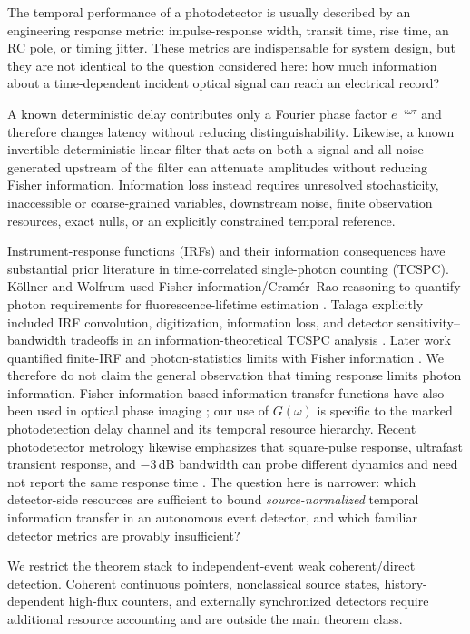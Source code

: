 \documentclass[aps,prapplied,preprint,nofootinbib]{revtex4-2}
\begin{document}
The temporal performance of a photodetector is usually described by an engineering response metric: impulse-response width, transit time, rise time, an RC pole, or timing jitter. These metrics are indispensable for system design, but they are not identical to the question considered here: how much information about a time-dependent incident optical signal can reach an electrical record?

A known deterministic delay contributes only a Fourier phase factor $e^{-i\omega\tau}$ and therefore changes latency without reducing distinguishability. Likewise, a known invertible deterministic linear filter that acts on both a signal and all noise generated upstream of the filter can attenuate amplitudes without reducing Fisher information. Information loss instead requires unresolved stochasticity, inaccessible or coarse-grained variables, downstream noise, finite observation resources, exact nulls, or an explicitly constrained temporal reference.

Instrument-response functions (IRFs) and their information consequences have substantial prior literature in time-correlated single-photon counting (TCSPC). K\"ollner and Wolfrum used Fisher-information/Cram\'er--Rao reasoning to quantify photon requirements for fluorescence-lifetime estimation \cite{KollnerWolfrum1992}. Talaga explicitly included IRF convolution, digitization, information loss, and detector sensitivity--bandwidth tradeoffs in an information-theoretical TCSPC analysis \cite{Talaga2009}. Later work quantified finite-IRF and photon-statistics limits with Fisher information \cite{Bouchet2019,TrinhEsposito2021}. We therefore do not claim the general observation that timing response limits photon information. Fisher-information-based information transfer functions have also been used in optical phase imaging \cite{KoppellKasevich2021}; our use of $G(\omega)$ is specific to the marked photodetection delay channel and its temporal resource hierarchy. Recent photodetector metrology likewise emphasizes that square-pulse response, ultrafast transient response, and $-3\,$dB bandwidth can probe different dynamics and need not report the same response time \cite{Deng2026}. The question here is narrower: which detector-side resources are sufficient to bound \emph{source-normalized} temporal information transfer in an autonomous event detector, and which familiar detector metrics are provably insufficient?

We restrict the theorem stack to independent-event weak coherent/direct detection. Coherent continuous pointers, nonclassical source states, history-dependent high-flux counters, and externally synchronized detectors require additional resource accounting and are outside the main theorem class.
\end{document}

